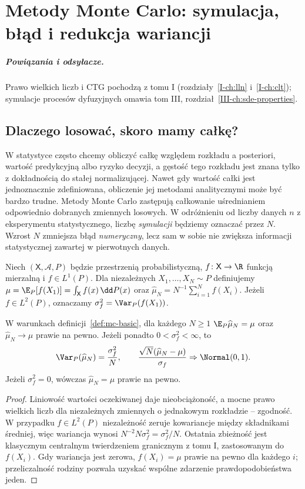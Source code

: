 \chapter{Metody Monte Carlo: symulacja, błąd i redukcja wariancji}
\label{ch:monte-carlo}
\paragraph{Powiązania i odsyłacze.} Prawo wielkich liczb i CTG pochodzą z tomu I (rozdziały~\ref{I-ch:lln} i~\ref{I-ch:clt}); symulacje procesów dyfuzyjnych omawia tom III, rozdział~\ref{III-ch:sde-properties}.


\section{Dlaczego losować, skoro mamy całkę?}
W statystyce często chcemy obliczyć całkę względem rozkładu a posteriori,
wartość predykcyjną albo ryzyko decyzji, a gęstość tego rozkładu jest
znana tylko z dokładnością do stałej normalizującej. Nawet gdy wartość
całki jest jednoznacznie zdefiniowana, obliczenie jej metodami
analitycznymi może być bardzo trudne. Metody Monte Carlo zastępują
całkowanie uśrednianiem odpowiednio dobranych zmiennych losowych.
W odróżnieniu od liczby danych $n$ z eksperymentu statystycznego,
liczbę \emph{symulacji} będziemy oznaczać przez $N$. Wzrost $N$ zmniejsza
błąd \emph{numeryczny}, lecz sam w sobie nie zwiększa informacji
statystycznej zawartej w pierwotnych danych.

\begin{definicja}
\label{def:mc-basic}
Niech $(\mathsf X,\mathcal A,P)$ będzie przestrzenią probabilistyczną,
$f\colon\mathsf X\to\R$ funkcją mierzalną i $f\in L^1(P)$.
Dla niezależnych $X_1,\ldots,X_N\sim P$ definiujemy
$\mu=\E_P[f(X_1)]=\int_{\mathsf X}f(x)\,\dd P(x)$ oraz
$\widehat\mu_N=N^{-1}\sum_{i=1}^N f(X_i)$.
Jeżeli $f\in L^2(P)$, oznaczamy
$\sigma_f^2=\Var_P(f(X_1))$.
\end{definicja}

\begin{twierdzenie}
\label{thm:mc-lln-clt}
W warunkach definicji~\ref{def:mc-basic}, dla każdego $N\ge1$
$\E_P\widehat\mu_N=\mu$ oraz $\widehat\mu_N\to\mu$
prawie na pewno. Jeżeli ponadto $0<\sigma_f^2<\infty$, to
\[
 \Var_P(\widehat\mu_N)=\frac{\sigma_f^2}{N},\qquad
 \frac{\sqrt N(\widehat\mu_N-\mu)}{\sigma_f}
 \Rightarrow\Normal(0,1).
\]
Jeżeli $\sigma_f^2=0$, wówczas $\widehat\mu_N=\mu$ prawie na pewno.
\end{twierdzenie}
\begin{proof}
Liniowość wartości oczekiwanej daje nieobciążoność, a mocne prawo
wielkich liczb dla niezależnych zmiennych o jednakowym rozkładzie
-- zgodność. W przypadku $f\in L^2(P)$ niezależność zeruje
kowariancje między składnikami średniej, więc wariancja wynosi
$N^{-2}N\sigma_f^2=\sigma_f^2/N$.
Ostatnia zbieżność jest klasycznym centralnym twierdzeniem granicznym
z tomu I, zastosowanym do $f(X_i)$. Gdy wariancja jest zerowa,
$f(X_i)=\mu$ prawie na pewno dla każdego $i$; przeliczalność
rodziny pozwala uzyskać wspólne zdarzenie prawdopodobieństwa jeden.
\end{proof}

